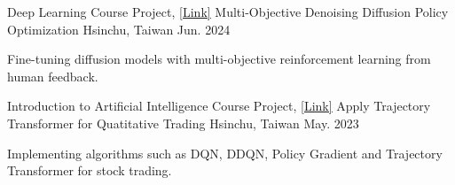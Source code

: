 

\begin{cventries}
  
\cventry
  {Deep Learning Course Project, \href{https://github.com/KJLdefeated/MODDPO}{\underline{[Link]}}} 
  {Multi-Objective Denoising Diffusion Policy Optimization} 
  {Hsinchu, Taiwan} 
  {Jun. 2024} 
  {
    \begin{cvitems} %
      \item {Fine-tuning diffusion models with multi-objective reinforcement learning from human feedback.}
    \end{cvitems}
  }

  \cventry
    {Introduction to Artificial Intelligence Course Project, \href{https://github.com/KJLdefeated/Trajectory-Transformer-for-Quatitative-Trading}{\underline{[Link]}}} 
    {Apply Trajectory Transformer for Quatitative Trading} 
    {Hsinchu, Taiwan} 
    {May. 2023} 
    {
      \begin{cvitems} %
        \item {Implementing algorithms such as DQN, DDQN, Policy Gradient and Trajectory Transformer for stock trading.}
      \end{cvitems}
    }




\end{cventries}
